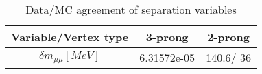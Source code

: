 \documentclass{article}
\begin{document}
\begin{table}[htbp]
\caption{\label{tab:sepVars}Data/MC agreement of separation variables}
\begin{center}
\begin{tabular}{c|c|c}
Variable/Vertex type & 3-prong & 2-prong\\
\hline
$\delta m_{\mu\mu} [MeV]$ & 6.31572e-05 & 140.6/ 36\\
\hline
\end{tabular}
\end{center}
\end{table}
\end{document}
